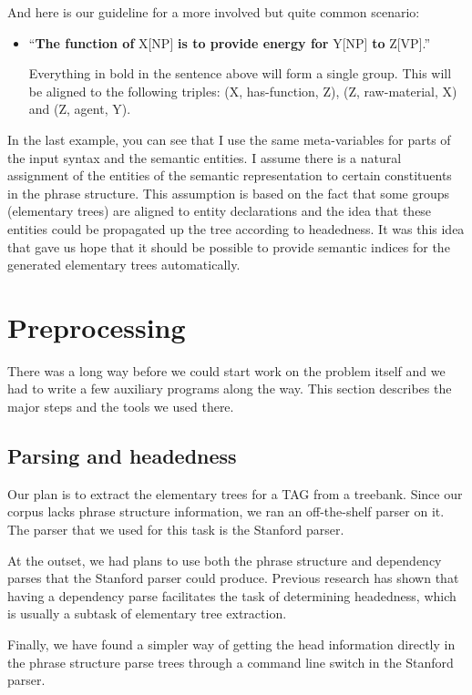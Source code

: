 \documentclass[a4paper]{article}
\begin{document}
And here is our guideline for a more involved but quite common
scenario:

\begin{itemize}
\item ``\textbf{The function of} X[NP] \textbf{is to provide energy
  for} Y[NP] \textbf{to} Z[VP].''

  Everything in bold in the sentence above will form a single group.
  This will be aligned to the following triples: (X, has-function, Z),
  (Z, raw-material, X) and (Z, agent, Y).
\end{itemize}

In the last example, you can see that I use the same meta-variables
for parts of the input syntax and the semantic entities. I assume
there is a natural assignment of the entities of the semantic
representation to certain constituents in the phrase structure. This
assumption is based on the fact that some groups (elementary trees)
are aligned to entity declarations and the idea that these entities
could be propagated up the tree according to headedness. It was this
idea that gave us hope that it should be possible to provide semantic
indices for the generated elementary trees automatically.


\section{Preprocessing}

There was a long way before we could start work on the problem itself
and we had to write a few auxiliary programs along the way. This
section describes the major steps and the tools we used there.

\subsection{Parsing and headedness}

Our plan is to extract the elementary trees for a TAG from a treebank.
Since our corpus lacks phrase structure information, we ran an
off-the-shelf parser on it. The parser that we used for this task is
the Stanford parser.

At the outset, we had plans to use both the phrase structure and
dependency parses that the Stanford parser could produce. Previous
research has shown that having a dependency parse facilitates the task
of determining headedness, which is usually a subtask of elementary
tree extraction.

Finally, we have found a simpler way of getting the head information
directly in the phrase structure parse trees through a command line
switch in the Stanford parser.
\end{document}
